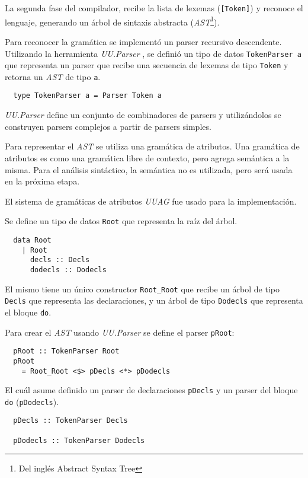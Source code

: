  La segunda fase del compilador, recibe la lista de lexemas (\texttt{[Token]}) y
reconoce el lenguaje, generando un árbol de
sintaxis abstracta (\emph{AST}\footnote{Del inglés Abstract Syntax Tree}).

  Para reconocer la gramática se implementó un parser recursivo descendente.
  Utilizando la herramienta \textit{UU.Parser} \cite{uuparser}, se definió un tipo de datos
  \texttt{TokenParser a} que representa un parser que recibe una secuencia de lexemas de tipo \texttt{Token}
  y retorna un \emph{AST} de tipo \texttt{a}.

  \begin{Verbatim}
  type TokenParser a = Parser Token a
  \end{Verbatim}

  \textit{UU.Parser} define un conjunto de combinadores de parsers y utilizándolos se construyen parsers
  complejos a partir de parsers simples.

  Para representar el \emph{AST} se utiliza una gramática de atributos.
  Una gramática de atributos es como una gramática libre de contexto, pero agrega semántica a la misma.
  Para el análisis sintáctico, la semántica no es utilizada, pero será usada en la próxima etapa.

  El sistema de gramáticas de atributos
  \textit{UUAG}\cite{uuag} fue usado para la implementación.


  Se define un tipo de datos \texttt{Root} que representa la raíz del árbol.

  \begin{Verbatim}
  data Root
    | Root
      decls :: Decls
      dodecls :: Dodecls
  \end{Verbatim}

  El mismo tiene un único constructor \texttt{Root\_Root} que recibe un árbol de tipo
  \texttt{Decls} que representa las declaraciones, y un árbol de tipo \texttt{Dodecls} que
  representa el bloque \texttt{do}.

  Para crear el \emph{AST} usando \textit{UU.Parser} se define el parser \texttt{pRoot}:

  \begin{Verbatim}
  pRoot :: TokenParser Root
  pRoot
    = Root_Root <$> pDecls <*> pDodecls
  \end{Verbatim}

  El cuál asume definido un parser de declaraciones \texttt{pDecls} y un parser
  del bloque \texttt{do} (\texttt{pDodecls}).
  
  \begin{Verbatim}
  pDecls :: TokenParser Decls

  pDodecls :: TokenParser Dodecls
  \end{Verbatim}

